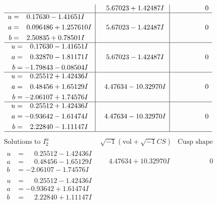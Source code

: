 \documentclass[1p]{elsarticle_modified}
\theoremstyle{definition}
\newcommand{\I}{\sqrt{-1}}
\begin{document}
$$\begin{array}{c|c|c}
 & \phantom{-}5.67023 + 1.42487 I & \phantom{-0.000000 } 0 \\ \hline\begin{aligned}
u &= \phantom{-}0.17630 - 1.41651 I \\
a &= \phantom{-}0.096486 + 1.257610 I \\
b &= \phantom{-}2.50835 + 0.78501 I\end{aligned}
 & \phantom{-}5.67023 - 1.42487 I & \phantom{-0.000000 } 0 \\ \hline\begin{aligned}
u &= \phantom{-}0.17630 - 1.41651 I \\
a &= \phantom{-}0.32870 - 1.81171 I \\
b &= -1.79843 - 0.08504 I\end{aligned}
 & \phantom{-}5.67023 - 1.42487 I & \phantom{-0.000000 } 0 \\ \hline\begin{aligned}
u &= \phantom{-}0.25512 + 1.42436 I \\
a &= \phantom{-}0.48456 + 1.65129 I \\
b &= -2.06107 + 1.74576 I\end{aligned}
 & \phantom{-}4.47634 - 10.32970 I & \phantom{-0.000000 } 0 \\ \hline\begin{aligned}
u &= \phantom{-}0.25512 + 1.42436 I \\
a &= -0.93642 - 1.61474 I \\
b &= \phantom{-}2.22840 - 1.11147 I\end{aligned}
 & \phantom{-}4.47634 - 10.32970 I & \phantom{-0.000000 } 0\\
 \hline 
 \end{array}$$\newpage$$\begin{array}{c|c|c}  
\text{Solutions to }I^u_{2}& \I (\text{vol} + \sqrt{-1}CS) & \text{Cusp shape}\\
 \hline 
\begin{aligned}
u &= \phantom{-}0.25512 - 1.42436 I \\
a &= \phantom{-}0.48456 - 1.65129 I \\
b &= -2.06107 - 1.74576 I\end{aligned}
 & \phantom{-}4.47634 + 10.32970 I & \phantom{-0.000000 } 0 \\ \hline\begin{aligned}
u &= \phantom{-}0.25512 - 1.42436 I \\
a &= -0.93642 + 1.61474 I \\
b &= \phantom{-}2.22840 + 1.11147 I\end{aligned}

\end{array}$$
\end{document}
